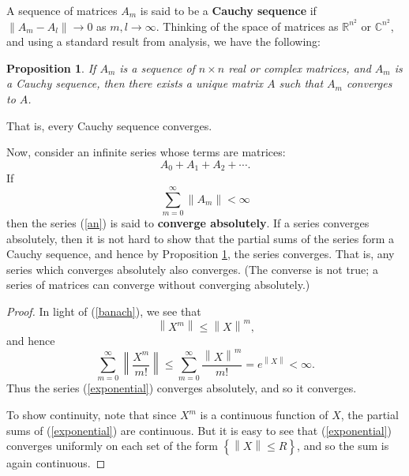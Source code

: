 \documentclass{amsbook}
\theoremstyle{plain}
\newtheorem{proposition}[theorem]{Proposition}
\numberwithin{equation}{chapter}
\numberwithin{theorem}{chapter}
\begin{document}
A sequence of matrices $A_{m}$ is said to be a \textbf{Cauchy sequence} if
$\left\|  A_{m}-A_{l}\right\|  \rightarrow0$ as $m,l\rightarrow\infty$.
Thinking of the space of matrices as $\mathbb{R}^{n^{2}}$ or $\mathbb{C}%
^{n^{2}}$, and using a standard result from analysis, we have the following:

\begin{proposition}
\label{cauchy}If $A_{m}$ is a sequence of $n\times n$ real or complex
matrices, and $A_{m}$ is a Cauchy sequence, then there exists a unique matrix
$A$ such that $A_{m}$ converges to $A$.
\end{proposition}

\noindent That is, every Cauchy sequence converges.

Now, consider an infinite series whose terms are matrices:
\begin{equation}
A_{0}+A_{1}+A_{2}+\cdots\text{.}\label{an}%
\end{equation}
If
\[
\sum_{m=0}^{\infty}\left\|  A_{m}\right\|  <\infty
\]
then the series (\ref{an}) is said to \textbf{converge absolutely}. If a
series converges absolutely, then it is not hard to show that the partial sums
of the series form a Cauchy sequence, and hence by Proposition \ref{cauchy},
the series converges. That is, any series which converges absolutely also
converges. (The converse is not true; a series of matrices can converge
without converging absolutely.)

\begin{proof}
In light of (\ref{banach}), we see that
\[
\left\|  X^{m}\right\|  \leq\left\|  X\right\|  ^{m}\text{,}%
\]
and hence
\[
\sum_{m=0}^{\infty}\left\|  \frac{X^{m}}{m!}\right\|  \leq\sum_{m=0}^{\infty
}\frac{\left\|  X\right\|  ^{m}}{m!}=e^{\left\|  X\right\|  }<\infty\text{.}%
\]
Thus the series (\ref{exponential}) converges absolutely, and so it converges.

To show continuity, note that since $X^{m}$ is a continuous function of $X$,
the partial sums of (\ref{exponential}) are continuous. But it is easy to see
that (\ref{exponential}) converges uniformly on each set of the form $\left\{
\left\|  X\right\|  \leq R\right\}  $, and so the sum is again continuous.
\end{proof}
\end{document}
